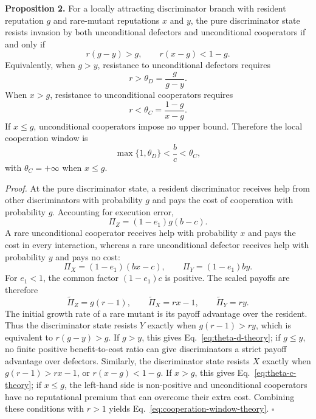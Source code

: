 \documentclass[fleqn,10pt]{wlscirep}
\begin{document}
\textbf{Proposition 2.}
For a locally attracting discriminator branch with resident reputation $g$ and rare-mutant reputations $x$ and $y$, the pure discriminator state resists invasion by both unconditional defectors and unconditional cooperators if and only if
\begin{equation}
\label{eq:window-inequalities-theory}
r(g-y)>g,\qquad r(x-g)<1-g.
\end{equation}
Equivalently, when $g>y$, resistance to unconditional defectors requires
\begin{equation}
\label{eq:theta-d-theory}
r>\theta_D=\frac{g}{g-y}.
\end{equation}
When $x>g$, resistance to unconditional cooperators requires
\begin{equation}
\label{eq:theta-c-theory}
r<\theta_C=\frac{1-g}{x-g}.
\end{equation}
If $x\le g$, unconditional cooperators impose no upper bound. Therefore the local cooperation window is
\begin{equation}
\label{eq:cooperation-window-theory}
\max\{1,\theta_D\}<\frac{b}{c}<\theta_C,
\end{equation}
with $\theta_C=+\infty$ when $x\le g$.

\textit{Proof.}
At the pure discriminator state, a resident discriminator receives help from other discriminators with probability $g$ and pays the cost of cooperation with probability $g$. Accounting for execution error,
\[
\Pi_Z=(1-e_1)g(b-c).
\]
A rare unconditional cooperator receives help with probability $x$ and pays the cost in every interaction, whereas a rare unconditional defector receives help with probability $y$ and pays no cost:
\[
\Pi_X=(1-e_1)(bx-c),\qquad
\Pi_Y=(1-e_1)by.
\]
For $e_1<1$, the common factor $(1-e_1)c$ is positive. The scaled payoffs are therefore
\[
\widetilde\Pi_Z=g(r-1),\qquad
\widetilde\Pi_X=rx-1,\qquad
\widetilde\Pi_Y=ry.
\]
The initial growth rate of a rare mutant is its payoff advantage over the resident. Thus the discriminator state resists $Y$ exactly when $g(r-1)>ry$, which is equivalent to $r(g-y)>g$. If $g>y$, this gives Eq.~\eqref{eq:theta-d-theory}; if $g\le y$, no finite positive benefit-to-cost ratio can give discriminators a strict payoff advantage over defectors. Similarly, the discriminator state resists $X$ exactly when $g(r-1)>rx-1$, or $r(x-g)<1-g$. If $x>g$, this gives Eq.~\eqref{eq:theta-c-theory}; if $x\le g$, the left-hand side is non-positive and unconditional cooperators have no reputational premium that can overcome their extra cost. Combining these conditions with $r>1$ yields Eq.~\eqref{eq:cooperation-window-theory}. \hfill$\square$
\end{document}
